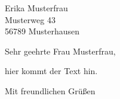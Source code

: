 \documentclass[%
  fontsize=12pt, %
  version=last%
  a4paper
]{scrlttr2}
\begin{document}
\begin{letter}{%
  Erika Musterfrau\\
  Musterweg 43\\
  56789 Musterhausen%
}




\opening{Sehr geehrte Frau Musterfrau,}

hier kommt der Text hin.

\closing{Mit freundlichen Grüßen}





\end{letter}
\end{document}

